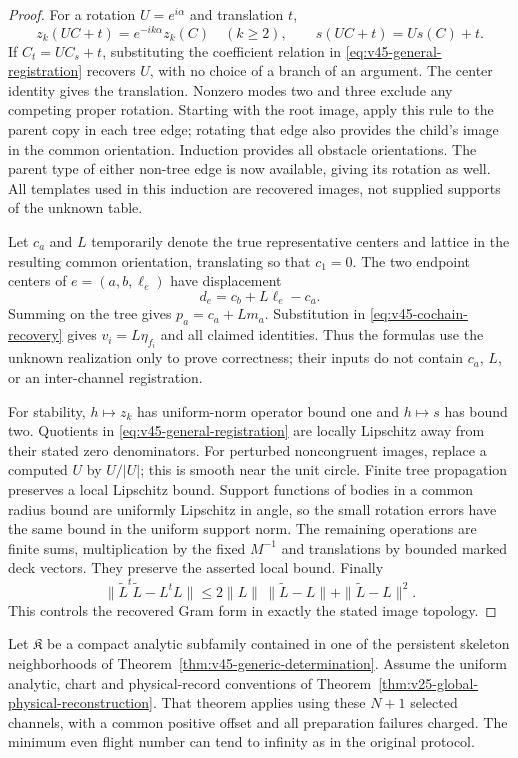 \begin{proof}
For a rotation $U=e^{i\alpha}$ and translation $t$,
\[
 z_k(UC+t)=e^{-ik\alpha}z_k(C)\quad(k\ge2),
 \qquad s(UC+t)=Us(C)+t.
\]
If $C_t=UC_s+t$, substituting the coefficient relation in
\eqref{eq:v45-general-registration} recovers $U$, with no choice of a
branch of an argument.  The center identity gives the translation.
Nonzero modes two and three exclude any competing proper rotation.
Starting with the root image, apply this rule to the parent copy in
each tree edge; rotating that edge also provides the child's image in
the common orientation.  Induction provides all obstacle orientations.
The parent type of either non-tree edge is now available, giving its
rotation as well.  All templates used in this induction are recovered
images, not supplied supports of the unknown table.

Let $c_a$ and $L$ temporarily denote the true representative centers and
lattice in the resulting common orientation, translating so that $c_1=0$.
The two endpoint centers of $e=(a,b,\ell_e)$ have displacement
\[
                         d_e=c_b+L\ell_e-c_a.
\]
Summing on the tree gives $p_a=c_a+Lm_a$.  Substitution in
\eqref{eq:v45-cochain-recovery} gives $v_i=L\eta_{f_i}$ and all claimed
identities.  Thus the formulas use the unknown realization only to prove
correctness; their inputs do not contain $c_a$, $L$, or an inter-channel
registration.

For stability, $h\mapsto z_k$ has uniform-norm operator bound one and
$h\mapsto s$ has bound two.  Quotients in
\eqref{eq:v45-general-registration} are locally Lipschitz away from their
stated zero denominators.  For perturbed noncongruent images, replace a
computed $U$ by $U/|U|$; this is smooth near the unit circle.  Finite tree
propagation preserves a local Lipschitz bound.  Support functions of
bodies in a common radius bound are uniformly Lipschitz in angle, so the
small rotation errors have the same bound in the uniform support norm.
The remaining operations are finite sums, multiplication by the fixed
$M^{-1}$ and translations by bounded marked deck vectors.  They preserve
the asserted local bound.  Finally
\[
 \|\widetilde L^t\widetilde L-L^tL\|
 \le2\|L\|\,\|\widetilde L-L\|+\|\widetilde L-L\|^2.
\]
This controls the recovered Gram form in exactly the stated image topology.
\end{proof}

\begin{corollary}
\label{cor:v45-physical-chart}
Let $\mathfrak K$ be a compact analytic subfamily contained in one of the
persistent skeleton neighborhoods of
Theorem~\ref{thm:v45-generic-determination}.  Assume the uniform analytic,
chart and physical-record conventions of
Theorem~\ref{thm:v25-global-physical-reconstruction}.  That theorem applies using
these $N+1$ selected channels, with a common positive offset and all
preparation failures charged.  The minimum even flight number can tend to
infinity as in the original protocol.
\end{corollary}

